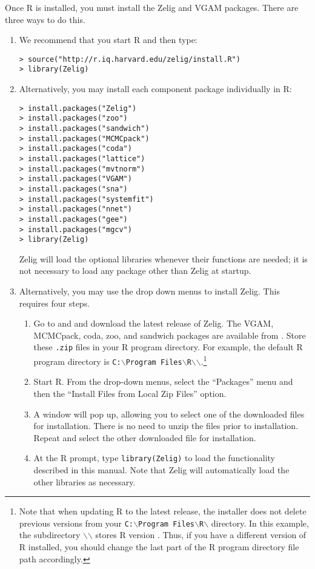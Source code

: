 Once R is installed, you must install the Zelig and VGAM packages.  There
are three ways to do this.  
\begin{enumerate}
\item We recommend that you start R and then type:
\begin{verbatim}
> source("http://r.iq.harvard.edu/zelig/install.R")
> library(Zelig)
\end{verbatim}
\item Alternatively, you may install each component package individually 
in R:
\begin{verbatim}
> install.packages("Zelig")
> install.packages("zoo")
> install.packages("sandwich")
> install.packages("MCMCpack")
> install.packages("coda")
> install.packages("lattice")
> install.packages("mvtnorm")
> install.packages("VGAM")
> install.packages("sna")
> install.packages("systemfit")
> install.packages("nnet")
> install.packages("gee")
> install.packages("mgcv")
> library(Zelig)
\end{verbatim}
Zelig will load the optional libraries whenever their functions are
needed; it is not necessary to load any package other than Zelig at startup.  

\item \label{manual.windows}Alternatively, you may use the drop down
  menus to install Zelig.  This requires four steps.
\begin{enumerate}
\item \label{win.zelig} Go to  and
  and download the latest release of Zelig.  The VGAM, MCMCpack,
coda, zoo, and sandwich packages are available from
.  Store these
  \texttt{.zip} files in your R program directory.  For example, the
  default R program directory is {\tt C:$\backslash$Program
  Files$\backslash$R$\backslash$\rwvers$\backslash$}.\footnote{Note
  that when updating R to the latest release, the installer does not
  delete previous versions from your {\tt C:$\backslash$Program
  Files$\backslash$R$\backslash$} directory.  In this example, the
  subdirectory {\tt $\backslash$\rwvers$\backslash$} stores R version
  \fullrvers.  Thus, if you have a different version of R installed,
  you should change the last part of the R program directory file path
  accordingly.}
\item Start R.  From the drop-down menus, select the ``Packages'' menu
  and then the ``Install Files from Local Zip Files'' option.
\item A window will pop up, allowing you to select one of the
  downloaded files for installation.  There is no need to unzip the
  files prior to installation.  Repeat and select the other downloaded
  file for installation.
\item At the R prompt, type \texttt{library(Zelig)} to load the
  functionality described in this manual.  Note that Zelig will
  automatically load the other libraries as necessary.
\end{enumerate}


\end{enumerate}
